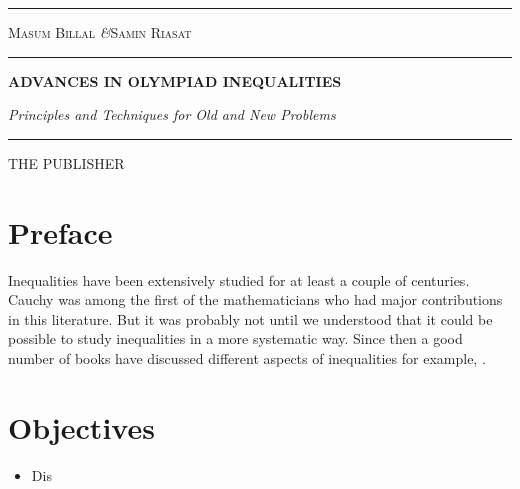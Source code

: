 \documentclass[a4paper, 12pt, leqno, twoside]{book}
\theoremstyle{definition}
\numberwithin{problem}{chapter}
\begin{document}
	\frontmatter
	\begin{titlepage}
		\pagecolor{splashedwhite}
		\txtheight
		\begin{minipage}[t]{0.05\txtwidth}
			\color{black}
			\rule{6pt}{\txtheight}
		\end{minipage}
		\hspace{0.05\txtwidth}
		\begin{minipage}[t]{2\txtwidth}
			\color{smokyblack}
			\vspace*{\drop}
			{\Large {\scshape Masum Billal} \quad\textit{\&}\quad \textsc{Samin Riasat}} \\
			\rule{1\txtwidth}{1pt} \par
			\vspace{3\baselineskip}
			{\noindent\bfseries ADVANCES IN OLYMPIAD INEQUALITIES} \par
			\vspace{2\baselineskip}
			{\large\itshape Principles and Techniques for Old and New Problems} \par
			\vspace{6.5\baselineskip}
			{\scshape } \par
			\vspace{0.1\baselineskip}
			{\Large } \par
			\vspace{\baselineskip}
			\rule{\txtwidth}{1pt} \par
			\vspace{\baselineskip}
			{\Large THE PUBLISHER}
		\end{minipage}
		\hfill
	\end{titlepage}

	\begin{refsection}
		\section*{Preface}

		Inequalities have been extensively studied for at least a couple of centuries. Cauchy was among the first of the mathematicians who had major contributions in this literature. But it was probably not until \textcite{hardy_littlewood_polya_1934} we understood that it could be possible to study inequalities in a more systematic way. Since then a good number of books have discussed different aspects of inequalities for example, \textcite{beckenbach_bellman_1983}.

		\section*{Objectives}
			\begin{itemize}
				\item Dis
			\end{itemize}
		\printbibliography
	\end{refsection}
	\tableofcontents
	\mainmatter
\end{document}
